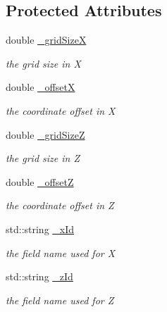 \subsection*{Protected Attributes}
\begin{DoxyCompactItemize}
\item 
double \hyperlink{class_d_d4hep_1_1_d_d_segmentation_1_1_cartesian_grid_x_z_a1ecb47b3c00cafed8fae40bb9bca2180}{\_\-gridSizeX}
\begin{DoxyCompactList}\small\item\em the grid size in X \item\end{DoxyCompactList}\item 
double \hyperlink{class_d_d4hep_1_1_d_d_segmentation_1_1_cartesian_grid_x_z_aa6bb5820863cb39d75382042623e0b6c}{\_\-offsetX}
\begin{DoxyCompactList}\small\item\em the coordinate offset in X \item\end{DoxyCompactList}\item 
double \hyperlink{class_d_d4hep_1_1_d_d_segmentation_1_1_cartesian_grid_x_z_a7de343951b44cd52f5953f6f016d0e25}{\_\-gridSizeZ}
\begin{DoxyCompactList}\small\item\em the grid size in Z \item\end{DoxyCompactList}\item 
double \hyperlink{class_d_d4hep_1_1_d_d_segmentation_1_1_cartesian_grid_x_z_a2105d391f22a6e8f8d75b0ad85183c21}{\_\-offsetZ}
\begin{DoxyCompactList}\small\item\em the coordinate offset in Z \item\end{DoxyCompactList}\item 
std::string \hyperlink{class_d_d4hep_1_1_d_d_segmentation_1_1_cartesian_grid_x_z_a49e0f437dc9ab286e9d916dc85d8309a}{\_\-xId}
\begin{DoxyCompactList}\small\item\em the field name used for X \item\end{DoxyCompactList}\item 
std::string \hyperlink{class_d_d4hep_1_1_d_d_segmentation_1_1_cartesian_grid_x_z_aa90fc4531dd5884afcc2c6c2a824ce18}{\_\-zId}
\begin{DoxyCompactList}\small\item\em the field name used for Z \item\end{DoxyCompactList}\end{DoxyCompactItemize}


